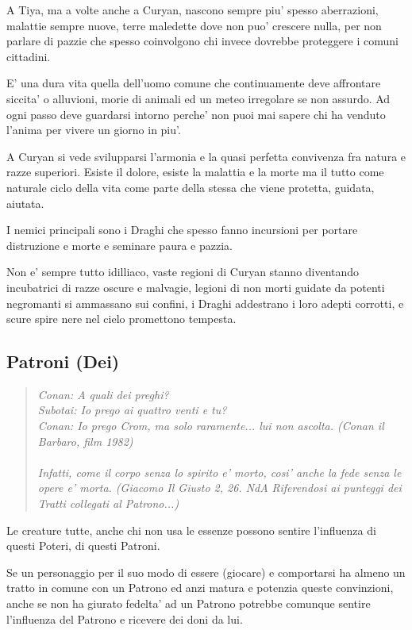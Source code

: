 \documentclass[a4paper,11pt,twoside,openany]{book}
\begin{document}
{A Tiya, ma a volte anche a Curyan, nascono sempre piu' spesso aberrazioni, malattie sempre nuove, terre maledette dove non puo' crescere nulla, per non parlare di pazzie che spesso coinvolgono chi invece dovrebbe proteggere i comuni cittadini.

E' una dura vita quella dell'uomo comune che continuamente deve affrontare siccita' o alluvioni, morie di animali ed un meteo irregolare se non assurdo. Ad ogni passo deve guardarsi intorno perche' non puoi mai sapere chi ha venduto l'anima per vivere un giorno in piu'.

A Curyan si vede svilupparsi l'armonia e la quasi perfetta convivenza fra natura e razze superiori. Esiste il dolore, esiste la malattia e la morte ma il tutto come naturale ciclo della vita come parte della stessa che viene protetta, guidata, aiutata.

I nemici principali sono i Draghi che spesso fanno incursioni per portare distruzione e morte e seminare paura e pazzia.

Non e' sempre tutto idilliaco, vaste regioni di Curyan stanno diventando incubatrici di razze oscure e malvagie, legioni di non morti guidate da potenti negromanti si ammassano sui confini, i Draghi addestrano i loro adepti corrotti, e scure spire nere nel cielo promettono tempesta.

\pagebreak

\subsection{Patroni (Dei)}

\label{patroni-dei}
\begin{quote}\textit{
Conan: A quali dei preghi?\\
Subotai: Io prego ai quattro venti e tu?\\
Conan: Io prego Crom, ma solo raramente... lui non ascolta. (Conan il Barbaro, film 1982)\\\\
Infatti, come il corpo senza lo spirito e' morto, cosi' anche la fede senza le opere e' morta. (Giacomo Il Giusto 2, 26. NdA Riferendosi ai punteggi dei Tratti collegati al Patrono...)}\end{quote}

Le creature tutte, anche chi non usa le essenze possono sentire l'influenza di questi Poteri, di questi Patroni.

Se un personaggio per il suo modo di essere (giocare) e comportarsi ha almeno un tratto in comune con un Patrono ed anzi matura e potenzia queste convinzioni, anche se non ha giurato fedelta' ad un Patrono potrebbe comunque sentire l'influenza del Patrono e ricevere dei doni da lui.

}
\end{document}
